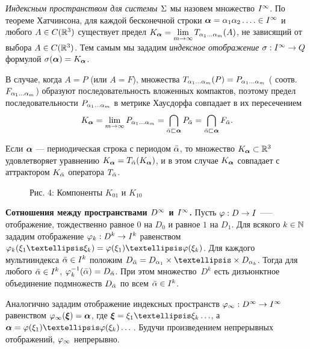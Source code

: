 {\em Индексным пространством для системы $\Sigma$} мы назовем множество $I^\infty$. По теореме Хатчинсона,
для каждой бесконечной строки  ${\bm{\alpha}}=\alpha_1\alpha_2\ldots.\in I^\infty$  и любого $A\in C(\mathbb{R}^3)$ существует предел $K_{\bm{\alpha}}=\lim\limits_{m\to\infty}T_{\alpha_1\ldots\alpha_m}(A)$, не зависящий от выбора   $A\in C(\mathbb{R}^3)$. Тем самым  мы зададим {\em индексное отображение} $\sigma:I^\infty\to Q$ формулой $\sigma({\bm{\alpha}})=K_{\bm{\alpha}}$.

 В случае, когда $A=P$ (или $A=F$),
множества $T_{\alpha_1\ldots\alpha_m}(P)=P_{\alpha_1\ldots\alpha_m}$ ( соотв.$F_{\alpha_1\ldots\alpha_m}$)  образуют последовательность вложенных компактов, поэтому предел последовательности $P_{\alpha_1\ldots\alpha_m}$ в метрике Хаусдорфа совпадает в их пересечением
\begin{equation}\label{sigma} 
K_{\bm{\alpha}}=\lim\limits_{m\to\infty}P_{\alpha_1\ldots\alpha_m}=\bigcap\limits_{{\bar{\alpha}}\sqsubset {\bm{\alpha}}}P_{\bar{\alpha}}=\bigcap\limits_{{\bar{\alpha}}\sqsubset {\bm{\alpha}}}F_{\bar{\alpha}}.
\end{equation}

Если ${\bm{\alpha}}$ --- периодическая строка с периодом $\bar{\alpha}$, то множество $K_{\bm{\alpha}}\subset \mathbb{R}^3$ удовлетворяет уравнению $K_{\bm{\alpha}}=T_{\bar{\alpha}}(K_{\bm{\alpha}})$, и  в этом случае $K_{\bm{\alpha}}$ совпадает с аттрактором  $K_{\bar{\alpha}}$ оператора  $T_{\bar{\alpha}}$.


\begin{figure}[b!]
\begin{center}
{\footnotesize Рис. 4: Компоненты $K_{01}$ и $K_{10}$}
\end{center}\end{figure}


{\bf Сотношения между пространствами $D^\infty$ и $I^\infty$.} Пусть $\varphi:D\to I$  —--  отображение, тождественно равное $0$ на   $D_0$ и равное $1$ на $D_1$. Для всякого $k\in\mathbb{N}$
зададим отображение $\varphi_k:D^k\to I^k$ равенством $\fy_k(\xi_1…\xi_k)=\fy(\xi_1)…\fy(\xi_k)$.
Для каждого мультииндекса  ${\bar{\alpha}}\in I^k$ положим $D_\bal=D_{\al_1}\times…\times D_{\al_k}$. Тогда для любого ${\bar{\alpha}}\in I^k$, $ \varphi_k^{-1}({\bar{\alpha}})=D_{\bar{\alpha}}$.
При этом множество~$D^k$ есть дизъюнктное объединение подмножеств $D_{\bar{\alpha}}$ по всем ${\bar{\alpha}}\in I^k$.

Аналогично зададим отображение индексных пространств $\varphi_\infty: D^\infty\to I^\infty$
 равенством $\varphi_\infty({\bm{\xi}})={\bm{\alpha}}$, где  $\bmx=\xi_1…\xi_k\ldots$, а  $\bma=\fy(\xi_1)…\fy(\xi_k)\ldots$\,. Будучи произведением непрерывных отображений, $\varphi_\infty$ непрерывно.

